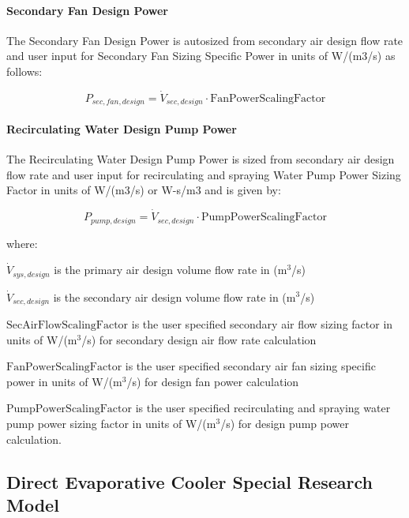 \paragraph{Secondary Fan Design Power}\label{secondary-fan-design-power}

The Secondary Fan Design Power is autosized from secondary air design flow rate and user input for Secondary Fan Sizing Specific Power in units of W/(m3/s) as follows:

\begin{equation}
P_{sec,fan,design} = \dot{V}_{sec,design}\cdot\text{FanPowerScalingFactor}
\end{equation}

\paragraph{Recirculating Water Design Pump Power}\label{recirculating-water-design-pump-power}

The Recirculating Water Design Pump Power is sized from secondary air design flow rate and user input for recirculating and spraying Water Pump Power Sizing Factor in units of W/(m3/s) or W-s/m3 and is given by:

\begin{equation}
P_{pump,design} = \dot{V}_{sec,design}\cdot\text{PumpPowerScalingFactor}
\end{equation}

where:

\(\dot{V}_{sys,design}\) is the primary air design volume flow rate in (m\(^{3}\)/s)

\(\dot{V}_{sec,design}\) is the secondary air design volume flow rate in (m\(^{3}\)/s)

\(\text{SecAirFlowScalingFactor}\) is the user specified secondary air flow sizing factor in units of W/(m\(^{3}\)/s) for secondary design air flow rate calculation

\(\text{FanPowerScalingFactor}\) is the user specified secondary air fan sizing specific power in units of W/(m\(^{3}\)/s) for design fan power calculation

\(\text{PumpPowerScalingFactor}\) is the user specified recirculating and spraying water pump power sizing factor in units of W/(m\(^{3}\)/s) for design pump power calculation.

\subsection{Direct Evaporative Cooler Special Research Model}\label{direct-evaporative-cooler-special-research-model}

